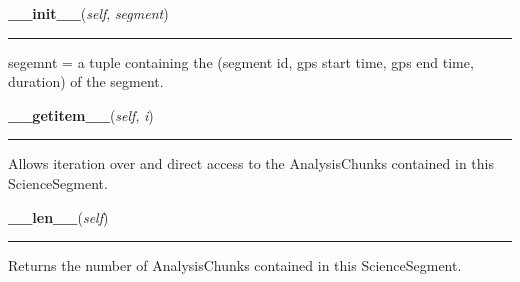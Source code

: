     \label{pipeline:ScienceSegment:__init__}
    \vspace{0.5ex}

    \noindent\begin{boxedminipage}{\textwidth}

    \raggedright \textbf{\_\_init\_\_}(\textit{self}, \textit{segment})

    \vspace{-1.5ex}

    \rule{\textwidth}{0.5\fboxrule}
    segemnt = a tuple containing the (segment id, gps start time, gps end 
    time, duration) of the segment.

    \vspace{1ex}

    \end{boxedminipage}

    \label{pipeline:ScienceSegment:__getitem__}
    \vspace{0.5ex}

    \noindent\begin{boxedminipage}{\textwidth}

    \raggedright \textbf{\_\_getitem\_\_}(\textit{self}, \textit{i})

    \vspace{-1.5ex}

    \rule{\textwidth}{0.5\fboxrule}
    Allows iteration over and direct access to the AnalysisChunks 
    contained in this ScienceSegment.

    \vspace{1ex}

    \end{boxedminipage}

    \label{pipeline:ScienceSegment:__len__}
    \vspace{0.5ex}

    \noindent\begin{boxedminipage}{\textwidth}

    \raggedright \textbf{\_\_len\_\_}(\textit{self})

    \vspace{-1.5ex}

    \rule{\textwidth}{0.5\fboxrule}
    Returns the number of AnalysisChunks contained in this 
    ScienceSegment.

    \vspace{1ex}

    \end{boxedminipage}

